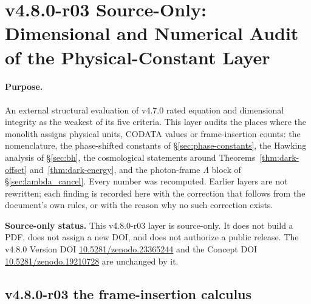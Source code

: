 
\clearpage
\section*{v4.8.0-r03 Source-Only: Dimensional and Numerical Audit of the Physical-Constant Layer}
\label{sec:v480-r03-dimensional-audit}

\paragraph{Purpose.}
An external structural evaluation of v4.7.0 rated equation and dimensional integrity as the
weakest of its five criteria.  This layer audits the places where the monolith assigns
physical units, CODATA values or frame-insertion counts: the nomenclature, the
phase-shifted constants of \S\ref{sec:phase-constants}, the Hawking analysis of
\S\ref{sec:bh}, the cosmological statements around
Theorems~\ref{thm:dark-offset} and~\ref{thm:dark-energy}, and the photon-frame
\(\Lambda\) block of \S\ref{sec:lambda_cancel}.  Every number was recomputed.  Earlier layers
are not rewritten; each finding is recorded here with the correction that follows from the
document's own rules, or with the reason why no such correction exists.

\noindent\textbf{Source-only status.}
This v4.8.0-r03 layer is source-only.  It does not build a PDF, does not assign a new DOI,
and does not authorize a public release.  The v4.8.0 Version DOI
\href{https://doi.org/10.5281/zenodo.23365244}{10.5281/zenodo.23365244} and the Concept DOI
\href{https://doi.org/10.5281/zenodo.19210728}{10.5281/zenodo.19210728} are unchanged by it.

\subsection*{v4.8.0-r03 the frame-insertion calculus}
\label{subsec:v480-r03-k-calculus}


